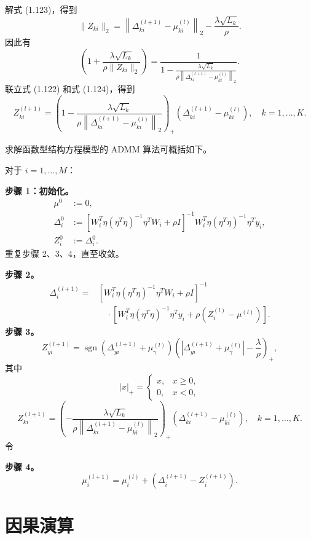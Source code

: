 解式 (1.123)，得到
\[
\|Z_{ki}\|_2=
\left\|\Delta_{ki}^{(l+1)}-\mu_{ki}^{(l)}\right\|_2
 -\frac{\lambda\sqrt{L_k}}{\rho}.
\]
因此有
\begin{equation}
\left(1+\frac{\lambda\sqrt{L_k}}{\rho\|Z_{ki}\|_2}\right)
=\frac{1}{\displaystyle
1-\frac{\lambda\sqrt{L_k}}
{\rho\left\|\Delta_{ki}^{(l+1)}-\mu_{ki}^{(l)}\right\|_2}}.
\tag{1.124}
\end{equation}
联立式 (1.122) 和式 (1.124)，得到
\begin{equation}
Z_{ki}^{(l+1)}
=\left(1-\frac{\lambda\sqrt{L_k}}
{\rho\left\|\Delta_{ki}^{(l+1)}-\mu_{ki}^{(l)}\right\|_2}\right)_+
\left(\Delta_{ki}^{(l+1)}-\mu_{ki}^{(l)}\right),
\quad k=1,\ldots,K.
\tag{1.125}
\end{equation}

求解函数型结构方程模型的 ADMM 算法可概括如下。

对于 $i=1,\ldots,M$：

\textbf{步骤 1：初始化。}
\[
\begin{aligned}
\mu^0&:=0,\\
\Delta_i^0&:=
\left[W_i^T\eta(\eta^T\eta)^{-1}\eta^TW_i+\rho I\right]^{-1}
W_i^T\eta(\eta^T\eta)^{-1}\eta^Ty_i,\\
Z_i^0&:=\Delta_i^0.
\end{aligned}
\]
重复步骤 2、3、4，直至收敛。

\textbf{步骤 2。}
\[
\begin{aligned}
\Delta_i^{(l+1)}
={}&\left[W_i^T\eta(\eta^T\eta)^{-1}\eta^TW_i+\rho I\right]^{-1}\\
&\quad\cdot\left[W_i^T\eta(\eta^T\eta)^{-1}\eta^Ty_i
 +\rho\left(Z_i^{(l)}-\mu^{(l)}\right)\right].
\end{aligned}
\]
\textbf{步骤 3。}
\[
Z_{yi}^{(l+1)}
=\operatorname{sgn}\left(\Delta_{yi}^{(l+1)}+\mu_\gamma^{(l)}\right)
\left(\left|\Delta_{yi}^{(l+1)}+\mu_\gamma^{(l)}\right|
 -\frac{\lambda}{\rho}\right)_+,
\]
其中
\[
|x|_+=\begin{cases}x,&x\geq0,\\0,&x<0,\end{cases}
\]
\[
Z_{ki}^{(l+1)}
=\left(-\frac{\lambda\sqrt{L_k}}
{\rho\left\|\Delta_{ki}^{(l+1)}-\mu_{ki}^{(l)}\right\|_2}\right)_+
\left(\Delta_{ki}^{(l+1)}-\mu_{ki}^{(l)}\right),
\quad k=1,\ldots,K.
\]
令

\textbf{步骤 4。}
\[
\mu_i^{(l+1)}=\mu_i^{(l)}
 +\left(\Delta_i^{(l+1)}-Z_i^{(l+1)}\right).
\]

\FloatBarrier
\section{因果演算}
\label{sec:ch01c-causal-calculus}

